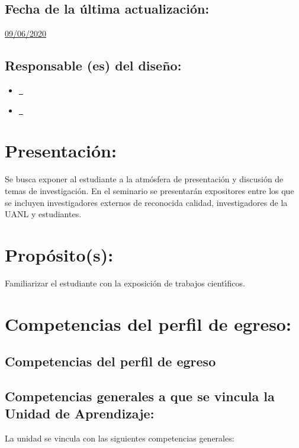 \documentclass[10 pt]{article}
\begin{document}
\subsection{Fecha de la \'{u}ltima actualizaci\'{o}n:} \underline{09/06/2020}
\subsection{Responsable (es) del dise\~{n}o:}
\begin{itemize}[label={}]
\item \underline{\ncesar~\cesar}
\item \underline{\nelisa~\elisa}
\end{itemize}
\newpage
\section{Presentaci\'{o}n:}

Se busca exponer al estudiante a la atm\'{o}sfera de presentaci\'{o}n y
discusi\'{o}n de temas de investigaci\'{o}n. En el seminario se presentar\'{a}n
expositores entre los que se incluyen investigadores externos de
reconocida calidad, investigadores de la UANL y estudiantes.


\section{Prop\'{o}sito(s):}

Familiarizar el estudiante con la exposici\'{o}n de trabajos cient\'{\i}ficos.

\section{Competencias del perfil de egreso:}
\subsection{Competencias del perfil de egreso}






  
\subsection{Competencias generales a que se vincula la Unidad de
    Aprendizaje:}

  La unidad se vincula con las siguientes competencias generales:
\end{document}
